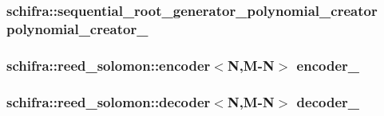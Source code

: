 \label{classefb_1_1ShifraFec_a80fe940d7742c12811d27cbb50d605dc}
\hypertarget{classefb_1_1ShifraFec_a6dd291fa5e301f1d88eba72e486c22d3}{
\subsubsection[{polynomial\_\-creator\_\-}]{\setlength{\rightskip}{0pt plus 5cm}schifra::sequential\_\-root\_\-generator\_\-polynomial\_\-creator {\bf polynomial\_\-creator\_\-}}}
\label{classefb_1_1ShifraFec_a6dd291fa5e301f1d88eba72e486c22d3}
\hypertarget{classefb_1_1ShifraFec_a48add19c7145ddef42b214f772508c0f}{
\subsubsection[{encoder\_\-}]{\setlength{\rightskip}{0pt plus 5cm}schifra::reed\_\-solomon::encoder$<$N,M-\/N$>$ {\bf encoder\_\-}}}
\label{classefb_1_1ShifraFec_a48add19c7145ddef42b214f772508c0f}
\hypertarget{classefb_1_1ShifraFec_acddab8a0f72a511d8b03ffecfe77735a}{
\subsubsection[{decoder\_\-}]{\setlength{\rightskip}{0pt plus 5cm}schifra::reed\_\-solomon::decoder$<$N,M-\/N$>$ {\bf decoder\_\-}}}
\label{classefb_1_1ShifraFec_acddab8a0f72a511d8b03ffecfe77735a}
